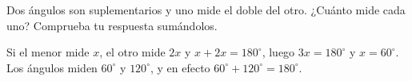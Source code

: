 \documentclass[11pt]{article}
\begin{document}
\begin{preguntas}
\pregunta[1] Dos ángulos son suplementarios y uno mide el doble del otro. ¿Cuánto mide cada
uno? Comprueba tu respuesta sumándolos.
\begin{solucion}[3cm]
Si el menor mide $x$, el otro mide $2x$ y $x + 2x = 180^\circ$, luego $3x = 180^\circ$ y
$x = 60^\circ$. Los ángulos miden $60^\circ$ y $120^\circ$, y en efecto
$60^\circ + 120^\circ = 180^\circ$.
\end{solucion}

\end{preguntas}
\end{document}
